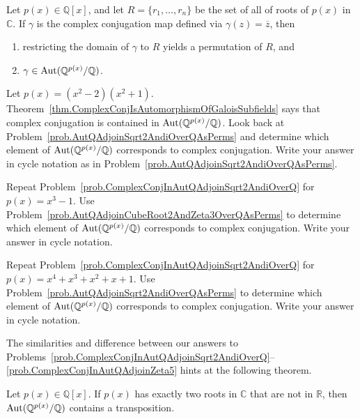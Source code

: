 \begin{theorem}\label{thm.ComplexConjIsAutomorphismOfGaloisSubfields}
Let $p(x) \in \mathbb{Q}[x]$, and let $R=\{r_1,\ldots,r_n\}$ be the set of all of roots of $p(x)$ in $\mathbb{C}$. If $\gamma$ is the complex conjugation map defined via $\gamma(z) = \overline{z}$, then 
\begin{enumerate}
\item restricting the domain of $\gamma$ to $R$ yields a permutation of $R$, and 
\item $\gamma \in \operatorname{Aut}(\mathbb{Q}^{p(x)}/\mathbb{Q})$.
\end{enumerate}
\end{theorem}

\begin{problem}\label{prob.ComplexConjInAutQAdjoinSqrt2AndiOverQ}
Let $p(x) = (x^2-2)(x^2+1)$. Theorem~\ref{thm.ComplexConjIsAutomorphismOfGaloisSubfields} says that complex conjugation is contained in $\operatorname{Aut}(\mathbb{Q}^{p(x)}/\mathbb{Q})$. Look back at Problem~\ref{prob.AutQAdjoinSqrt2AndiOverQAsPerms} and determine which element of $\operatorname{Aut}(\mathbb{Q}^{p(x)}/\mathbb{Q})$ corresponds to complex conjugation. Write your answer in cycle notation as in Problem~\ref{prob.AutQAdjoinSqrt2AndiOverQAsPerms}.
\end{problem}

\begin{problem}\label{prob.ComplexConjInAutQAdjoinCubeRoot2AndZeta3OverQ}
Repeat Problem~\ref{prob.ComplexConjInAutQAdjoinSqrt2AndiOverQ} for $p(x) = x^3-1$. Use Problem~\ref{prob.AutQAdjoinCubeRoot2AndZeta3OverQAsPerms} to determine which element of $\operatorname{Aut}(\mathbb{Q}^{p(x)}/\mathbb{Q})$ corresponds to complex conjugation.  Write your answer in cycle notation.
\end{problem}

\begin{problem}\label{prob.ComplexConjInAutQAdjoinZeta5}
Repeat Problem~\ref{prob.ComplexConjInAutQAdjoinSqrt2AndiOverQ} for $p(x) = x^4+x^3+x^2+x+1$. Use Problem~\ref{prob.AutQAdjoinSqrt2AndiOverQAsPerms} to determine which element of $\operatorname{Aut}(\mathbb{Q}^{p(x)}/\mathbb{Q})$ corresponds to complex conjugation. Write your answer in cycle notation.
\end{problem}

The similarities and difference between our answers to Problems~\ref{prob.ComplexConjInAutQAdjoinSqrt2AndiOverQ}--\ref{prob.ComplexConjInAutQAdjoinZeta5}  hints at the following theorem.

\begin{theorem}\label{thm.PolyWithOnlyTwoComplexRootsYieldsTransposition}
Let $p(x) \in \mathbb{Q}[x]$. If $p(x)$ has exactly two roots in $\mathbb{C}$ that are not in $\mathbb{R}$, then $\operatorname{Aut}(\mathbb{Q}^{p(x)}/\mathbb{Q})$ contains a transposition.
\end{theorem}

